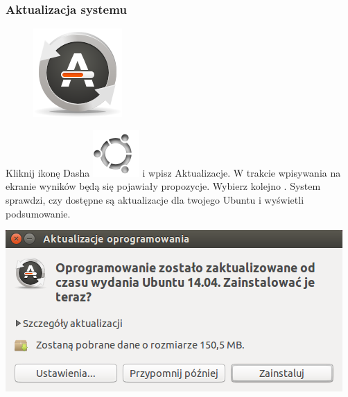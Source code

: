 \label{rzeczy_do_zrobienia_po_instalacji}
\subsubsection{Aktualizacja systemu}
\begin{figure}
	\vspace{-10pt}
	\includegraphics[width=\linewidth]{images/pierwsze_uruchomienie_aktualizacja1.png}
\end{figure}

Kliknij ikonę Dasha \includegraphics[scale=0.35]{images/ikony_dash.png} i wpisz \textcolor{ubuntu_orange}{Aktualizacje}. W trakcie wpisywania na ekranie wyników będą się pojawiały propozycje. Wybierz kolejno .
System sprawdzi, czy dostępne są aktualizacje dla twojego Ubuntu i wyświetli podsumowanie.

\begin{center}
	\includegraphics[width=\linewidth]{images/pierwsze_uruchomienie_aktualizacja2.png}
\end{center}

